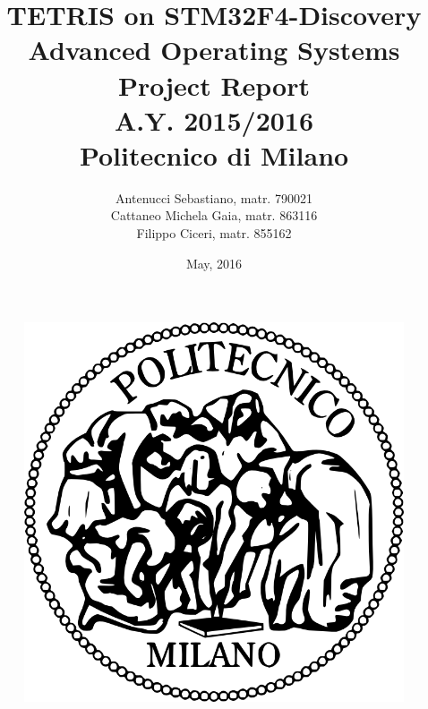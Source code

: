 \documentclass[18pt,oneside,a4paper, titlepage]{article}
\begin{document}
\begin{figure}[t]
	\centering
	\includegraphics[scale=0.35]{logo-polimi.png}
\end{figure}
\title{\textbf{TETRIS on STM32F4-Discovery}\\Advanced Operating Systems Project Report\\ A.Y. 2015/2016\\
	Politecnico di Milano}	
\author{Antenucci Sebastiano, matr. 790021\\Cattaneo Michela Gaia, matr. 863116\\Filippo Ciceri, matr. 855162 }
\date{May, 2016}
\maketitle

\newpage
	\tableofcontents

\newpage
\end{document}
